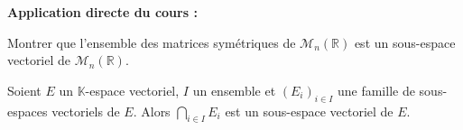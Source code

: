 \documentclass[french,11pt,twoside]{VcCours}
\newenvironment{ApplicationDirecte}{\textbf{Application directe du cours :}

}{}
\begin{document}

\begin{ApplicationDirecte} Montrer que l'ensemble des matrices symétriques de $\mathcal{M}_n(\mathbb{R})$ est un sous-espace vectoriel de $\mathcal{M}_n(\mathbb{R})$. \end{ApplicationDirecte}

\begin{Proposition}{}
Soient $E$ un $\mathbb{K}$-espace vectoriel, $I$ un ensemble et $(E_i)_{i \in I}$ une famille de sous-espaces vectoriels de $E$. Alors $\bigcap_{i \in I} E_i$ est un sous-espace vectoriel de $E$.
\end{Proposition}

\begin{Demonstration}{}
\vspace{5cm}
\end{Demonstration}
\end{document}
